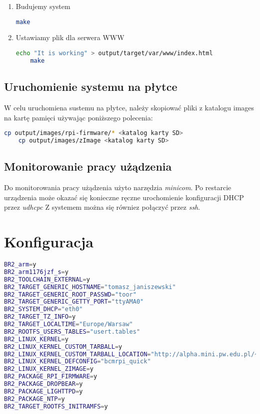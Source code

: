 \begin{enumerate}
\begin{itemize}
		\item Packages 
		\begin{itemize}
			\item ntp
			\item ntpdate
			\item dhcp client (domyślnie w \emph{busybox}
			\item dropbear 
			\item lighttpd
		\end{itemize}
	\end{itemize}
	\item Budujemy system
	\begin{lstlisting}[language=bash]
	make
	\end{lstlisting}	
	\item Ustawiamy plik dla serwera WWW
	\begin{lstlisting}[language=bash]
	echo "It is working" > output/target/var/www/index.html
	make 
	\end{lstlisting}	
\end{enumerate}

\subsection{Uruchomienie systemu na płytce}
W celu uruchomiena sustemu na płytce, należy skopiować pliki z katalogu images na kartę pamięci używając poniższego polecenia:
	\begin{lstlisting}[language=bash]
	cp output/images/rpi-firmware/* <katalog karty SD>
	cp output/images/zImage <katalog karty SD>
	\end{lstlisting}	
	
\subsection{Monitorowanie pracy użądzenia}
Do monitorowania pracy użądzenia użyto narzędzia \emph{minicom}. Po restarcie urządzenia może okazać się konieczne ręczne urochomienie konfiguracji DHCP przez \emph{udhcpc}
Z systemem można się równiez połączyć przez \emph{ssh}.


\section{Konfiguracja}

\begin{lstlisting}[language=bash,caption=configs/raspberrypi\_defconfig]
BR2_arm=y
BR2_arm1176jzf_s=y
BR2_TOOLCHAIN_EXTERNAL=y
BR2_TARGET_GENERIC_HOSTNAME="tomasz_janiszewski"
BR2_TARGET_GENERIC_ROOT_PASSWD="toor"
BR2_TARGET_GENERIC_GETTY_PORT="ttyAMA0"
BR2_SYSTEM_DHCP="eth0"
BR2_TARGET_TZ_INFO=y
BR2_TARGET_LOCALTIME="Europe/Warsaw"
BR2_ROOTFS_USERS_TABLES="usert.tables"
BR2_LINUX_KERNEL=y
BR2_LINUX_KERNEL_CUSTOM_TARBALL=y
BR2_LINUX_KERNEL_CUSTOM_TARBALL_LOCATION="http://alpha.mini.pw.edu.pl/~zabolotnyw/linux-c256eb9968c8997dce47350d2075e42f1b3991d3.tar.gz"
BR2_LINUX_KERNEL_DEFCONFIG="bcmrpi_quick"
BR2_LINUX_KERNEL_ZIMAGE=y
BR2_PACKAGE_RPI_FIRMWARE=y
BR2_PACKAGE_DROPBEAR=y
BR2_PACKAGE_LIGHTTPD=y
BR2_PACKAGE_NTP=y
BR2_TARGET_ROOTFS_INITRAMFS=y
\end{lstlisting}	


